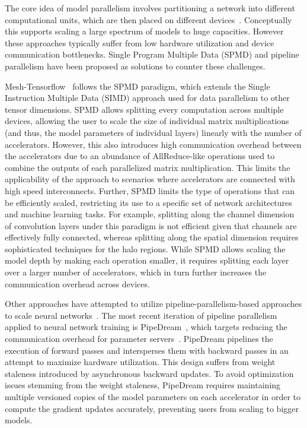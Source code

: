 \documentclass{article}
\begin{document}
The core idea of model parallelism involves partitioning a network into different computational units, which are then placed on different devices~\cite{krizhevsky2014one, lee2014model, mirhoseini2017device,dean12disbelief}. Conceptually this supports scaling a large spectrum of models to huge capacities. However these approaches typically suffer from low hardware utilization and device communication bottlenecks. Single Program Multiple Data (SPMD) and pipeline parallelism have been proposed as solutions to counter these challenges.

Mesh-Tensorflow~\cite{shazeer2018mesh} follows the SPMD paradigm, which extends the Single Instruction Multiple Data (SIMD) approach used for data parallelism to other tensor dimensions. SPMD allows splitting every computation across multiple devices, allowing the user to scale the size of individual matrix multiplications (and thus, the model parameters of individual layers) linearly with the number of accelerators. However, this also introduces high communication overhead between the accelerators due to an abundance of AllReduce-like operations used to combine the outputs of each parallelized matrix multiplication. This limits the applicability of the approach to scenarios where accelerators are connected with high speed interconnects. Further, SPMD limits the type of operations that can be efficiently scaled, restricting its use to a specific set of network architectures and machine learning tasks. For example, splitting along the channel dimension of convolution layers under this paradigm is not efficient given that channels are effectively fully connected, whereas splitting along the spatial dimension requires sophisticated techniques for the halo regions. While SPMD allows scaling the model depth by making each operation smaller, it requires splitting each layer over a larger number of accelerators, which in turn further increases the communication overhead across devices.

Other approaches have attempted to utilize pipeline-parallelism-based approaches to scale neural networks~\cite{petrowski93perf,wu2016google}. The most recent iteration of pipeline parallelism applied to neural network training is PipeDream~\cite{harlap2018pipedream}, which targets reducing the communication overhead for parameter servers~\cite{li2014scaling}. PipeDream pipelines the execution of forward passes and intersperses them with backward passes in an attempt to maximize hardware utilization. This design suffers from weight staleness introduced by asynchronous backward updates. To avoid optimization issues stemming from the weight staleness, PipeDream requires maintaining multiple versioned copies of the model parameters on each accelerator in order to compute the gradient updates accurately, preventing users from scaling to bigger models.
\end{document}
